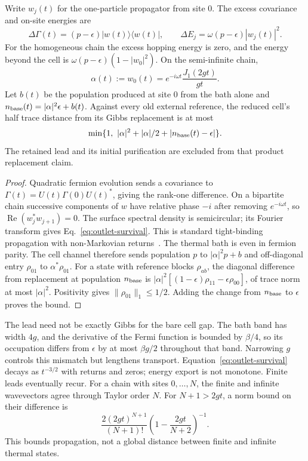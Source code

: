 \begin{proposition}
\label{prop:local-outlet}
Write $w_j(t)$ for the one-particle propagator from site 0.
The excess covariance and on-site energies are
\begin{equation}\label{eq:outlet-energy}
 \Delta\Gamma(t)=(p-\epsilon)|w(t)\rangle\langle w(t)|,
 \qquad \Delta E_j=\omega(p-\epsilon)|w_j(t)|^2.
\end{equation}
For the homogeneous chain the excess hopping energy is zero, and
the energy beyond the cell is
$\omega(p-\epsilon)(1-|w_0|^2)$.
On the semi-infinite chain,
\begin{equation}\label{eq:outlet-survival}
 \alpha(t):=w_0(t)=e^{-i\omega t}\frac{J_1(2gt)}{gt}.
\end{equation}
Let $b(t)$ be the population produced at site 0 from the bath alone and
$n_{\rm base}(t)=|\alpha|^2\epsilon+b(t)$.
Against every old external reference, the reduced cell's half trace
distance from its Gibbs replacement is at most
\begin{equation}\label{eq:outlet-reference-error}
 \min\{1,\ |\alpha|^2+|\alpha|/2
                    +|n_{\rm base}(t)-\epsilon|\}.
\end{equation}
The retained lead and its initial purification are excluded from that
product replacement claim.
\end{proposition}
\begin{proof}
Quadratic fermion evolution sends a covariance to
$\Gamma(t)=U(t)\Gamma(0)U(t)^*$, giving the rank-one difference.
On a bipartite chain successive components of $w$ have relative phase
$-i$ after removing $e^{-i\omega t}$, so
$\operatorname{Re}(w_j^*w_{j+1})=0$.
The surface spectral density is semicircular; its Fourier transform gives
Eq.~\eqref{eq:outlet-survival}. This is standard tight-binding propagation
with non-Markovian returns~\cite[Sec.~III]{RufeilFiori2009}.
The thermal bath is even in fermion parity. The cell channel therefore
sends population $p$ to $|\alpha|^2p+b$ and off-diagonal entry
$\rho_{01}$ to $\alpha^*\rho_{01}$.
For a state with reference blocks $\rho_{ab}$, the diagonal difference
from replacement at population $n_{\rm base}$ is
$|\alpha|^2[(1-\epsilon)\rho_{11}-\epsilon\rho_{00}]$, of trace norm
at most $|\alpha|^2$. Positivity gives $\|\rho_{01}\|_1\le1/2$.
Adding the change from $n_{\rm base}$ to $\epsilon$ proves the bound.
\end{proof}

The lead need not be exactly Gibbs for the bare cell gap. The bath band
has width $4g$, and the derivative of the Fermi function is bounded by
$\beta/4$, so its occupation differs from $\epsilon$ by at most
$\beta g/2$ throughout that band. Narrowing $g$ controls this mismatch
but lengthens transport. Equation~\eqref{eq:outlet-survival} decays as
$t^{-3/2}$ with returns and zeros; energy export is not monotone.
Finite leads eventually recur. For a chain with sites $0,\ldots,N$,
the finite and infinite wavevectors agree through Taylor order $N$.
For $N+1>2gt$, a norm bound on their difference is
\[
 \frac{2(2gt)^{N+1}}{(N+1)!}
       \left(1-\frac{2gt}{N+2}\right)^{-1}.
\]
This bounds propagation, not a global distance between finite and
infinite thermal states.

